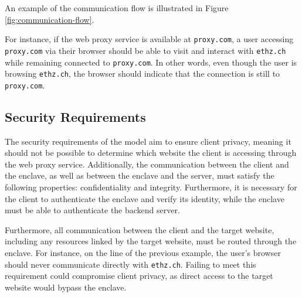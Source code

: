An example of the communication flow is illustrated in Figure \ref{fig:communication-flow}.

For instance, if the web proxy service is available at \texttt{proxy.com}, a user accessing \texttt{proxy.com} via their browser should be able to visit and interact with \texttt{ethz.ch} while remaining connected to \texttt{proxy.com}. In other words, even though the user is browsing \texttt{ethz.ch}, the browser should indicate that the connection is still to \texttt{proxy.com}.

\subsection{Security Requirements}
The security requirements of the model aim to ensure client privacy, meaning it should not be possible to determine which website the client is accessing through the web proxy service. Additionally, the communication between the client and the enclave, as well as between the enclave and the server, must satisfy the following properties: confidentiality and integrity. Furthermore, it is necessary for the client to authenticate the enclave and verify its identity, while the enclave must be able to authenticate the backend server.

Furthermore, all communication between the client and the target website, including any resources linked by the target website, must be routed through the enclave. For instance, on the line of the previous example, the user's browser should never communicate directly with \texttt{ethz.ch}. Failing to meet this requirement could compromise client privacy, as direct access to the target website would bypass the enclave.